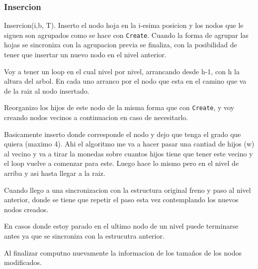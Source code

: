 \documentclass[10pt]{beamer}
\begin{document}
\begin{frame}
  \pause

\end{frame}




\begin{frame}
\frametitle{Insercion}
  Insercion(i,b, T). Inserto el nodo hoja en la i-esima posicion y los nodos que le siguen son agrupados
  como se hace con  \texttt{Create}.
  Cuando la forma de agrupar las hojas se sincroniza con la agrupacion previa se finaliza, con
  la posibilidad de tener que insertar un nuevo nodo en el nivel anterior.


  Voy a tener un loop en el cual nivel por nivel, arrancando desde h-1, con h la altura del arbol.
  En cada uno arranco por el nodo que esta en el camino que va de la raiz al nodo insertado.

  Reorganizo los hijos de este nodo de la misma forma que con \texttt{Create}, y voy creando
  nodos vecinos a continuacion en caso de necesitarlo.

  Basicamente inserto donde corresponde el nodo y dejo que tenga el grado que quiera (maximo 4).
  Ahi el algoritmo me va a hacer pasar una cantiad de hijos (w) al vecino y va a tirar la monedas
  sobre cuantos hijos tiene que tener este vecino y el loop vuelve a comenzar para este.
  Luego hace lo mismo pero en el nivel de arriba y asi hasta llegar a la raiz.

  Cuando llego a una sincronizacion con la estructura original freno y paso al nivel anterior, donde
  se tiene que repetir el paso esta vez contemplando los nuevos nodos creados.

  En casos donde estoy parado en el ultimo nodo de un nivel puede terminarse antes ya que se sincroniza
  con la estrucutra anterior.

   Al finalizar computno nuevamente la informacion de los tamaños de los nodos modificados.
\end{frame}
\end{document}
